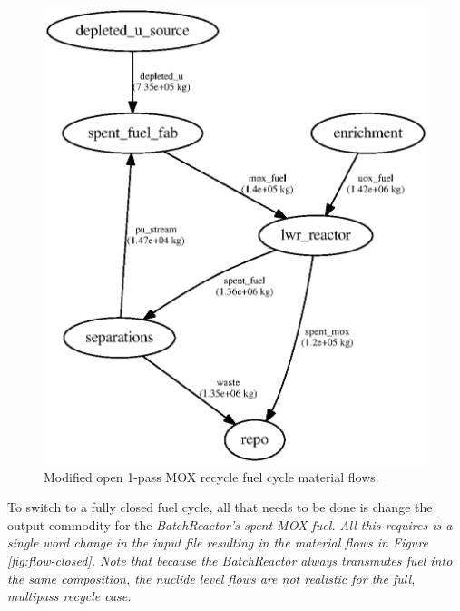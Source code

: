 \begin{figure}
\label{fig:flow-modopen}
\caption{Modified open 1-pass MOX recycle fuel cycle material flows.}
\begin{center}
\includegraphics{./images/flow-mod-open-1.eps}
\end{center}
\end{figure}

To switch to a fully closed fuel cycle, all that needs to be done is change
the output commodity for the \em{BatchReactor}'s spent MOX fuel.  All this
requires is a single word change in the input file resulting in the material
flows in Figure \ref{fig:flow-closed}.  Note that because the
\em{BatchReactor} always transmutes fuel into the same composition, the
nuclide level flows are not realistic for the full, multipass recycle case.


